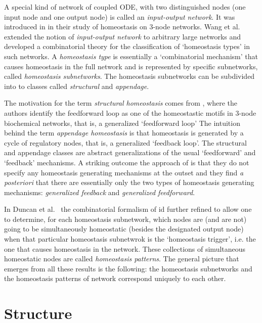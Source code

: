 \documentclass[a4paper,fleqn]{cas-dc}
\newcommand{\etal}{\textrm{et al.}}
\begin{document}
A special kind of network of coupled ODE, with two distinguished nodes (one input node and one output node)
is called an \emph{input-output network}.
It was introduced in \cite{wang2020} in their study of homeostasis on $3$-node networks.
Wang \etal~\cite{wang2021} extended the notion of \emph{input-output network} to arbitrary large networks and developed a combinatorial theory for the classification of `homeostasis types' in such networks.
A \emph{homeostasis type} is essentially a `combinatorial mechanism' that causes homeostasis in the full network and is represented by specific subnetworks, called \emph{homeostasis subnetworks}.
The homeostasis subnetworks can be subdivided into to classes called \emph{structural} and \emph{appendage}.

The motivation for the term \emph{structural homeostasis} comes from \cite{rbgsn2017}, where the authors identify the feedforward loop as one of the homeostastic motifs in $3$-node biochemical networks, that is, a generalized `feedforward loop' 
The intuition behind the term \emph{appendage homeostasis} is that homeostasis is generated by a cycle of regulatory nodes, that is, a generalized `feedback loop'.
The structural and appendage classes are abstract generalizations of the usual `feedforward' and `feedback' mechanisms. 
A striking outcome the approach of \cite{wang2021} is that they do not specify any homeostasis generating mechanisms at the outset and they find \emph{a posteriori} that there are essentially only the two types of homeostasis generating mechanisms: \emph{generalized feedback} and \emph{generalized feedforward}.

In Duncan \etal~\cite{duncan2024} the combinatorial formalism of \cite{wang2021} id further refined to allow one to determine, for each homeostasis subnetwork, which nodes are (and are not) going to be simultaneously homeostatic (besides the designated output node) when that particular homeostasis subnetwrok is the `homeostasis trigger', i.e. the one that causes homeostasis in the network.
These collections of simultaneous homeostatic nodes are called \emph{homeostasis patterns}.
The general picture that emerges from all these results is the following: the homeostasis subnetworks and the homeostasis patterns of network correspond uniquely to each other.
\pagebreak

\section{Structure}
\label{SEC:STRUC}
\end{document}
